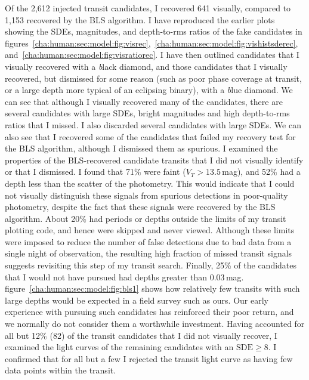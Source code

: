 Of the 2,612 injected transit candidates, I recovered 641 visually, compared to 1,153 recovered by the BLS algorithm.
I have reproduced the earlier plots showing the SDEs, magnitudes, and depth-to-rms ratios of the fake candidates in figures~\ref{cha:human:sec:model:fig:visrec},~\ref{cha:human:sec:model:fig:vishistsderec}, and~\ref{cha:human:sec:model:fig:visratiorec}. I have then outlined candidates that I visually recovered with a {\textit black diamond}, and those candidates that I visually recovered, but dismissed for some reason (such as poor phase coverage at transit, or a large depth more typical of an eclipsing binary), with a {\textit blue diamond.}
We can see that although I visually recovered many of the candidates, there are several candidates with large SDEs, bright magnitudes and high depth-to-rms ratios that I missed.
I also discarded several candidates with large SDEs.
We can also see that I recovered some of the candidates that failed my recovery test for the BLS algorithm, although I dismissed them as spurious.
I examined the properties of the BLS-recovered candidate transits that I did not visually identify or that I dismissed.
I found that 71\% were faint ($V_{T}>13.5$\,mag), and 52\% had a depth less than the scatter of the photometry.
This would indicate that I could not visually distinguish these signals from spurious detections in poor-quality photometry, despite the fact that these signals were recovered by the BLS algorithm.
About 20\% had periods or depths outside the limits of my transit plotting code, and hence were skipped and never viewed.
Although these limits were imposed to reduce the number of false detections due to bad data from a single night of observation, the resulting high fraction of missed transit signals suggests revisiting this step of my transit search.
Finally, 25\% of the candidates that I would not have pursued had depths greater than 0.03\,mag.
figure~\ref{cha:human:sec:model:fig:bls1} %
shows how relatively few transits with such large depths would be expected in a field survey such as ours.
Our early experience with pursuing such candidates has reinforced their poor return, and we normally do not consider them a worthwhile investment.
Having accounted for all but 12\% (82) of the transit candidates that I did not visually recover, I examined the light curves of the remaining candidates with an $\mathrm{SDE}\geq8$.
I confirmed that for all but a few I rejected the transit light curve as having few data points within the transit.


